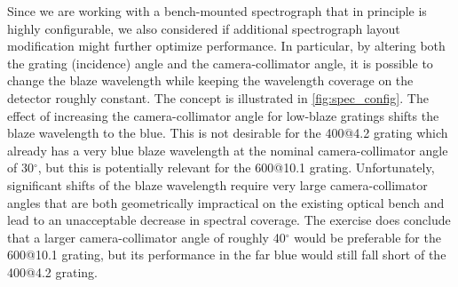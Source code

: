 Since we are working with a bench-mounted spectrograph that in
principle is highly configurable, we also considered if additional
spectrograph layout modification might further optimize
performance. In particular, by altering both the grating (incidence)
angle and the camera-collimator angle, it is possible to change the
blaze wavelength while keeping the wavelength coverage on the detector
roughly constant. The concept is illustrated in \ref{fig:spec_config}.
The effect of increasing the camera-collimator angle for low-blaze
gratings shifts the blaze wavelength to the blue. This is not
desirable for the 400@4.2 grating which already has a very blue blaze
wavelength at the nominal camera-collimator angle of 30$^{\circ}$, but
this is potentially relevant for the 600@10.1 grating. Unfortunately,
significant shifts of the blaze wavelength require very large
camera-collimator angles that are both geometrically impractical on
the existing optical bench and lead to an unacceptable decrease in
spectral coverage. The exercise does conclude that a larger
camera-collimator angle of roughly 40$^{\circ}$ would be preferable
for the 600@10.1 grating, but its performance in the far blue would
still fall short of the 400@4.2 grating.

